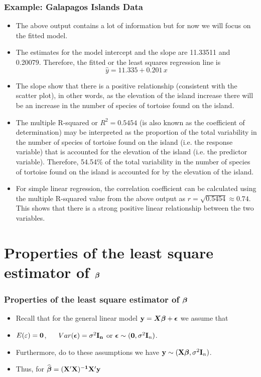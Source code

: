 \documentclass{beamer}
\begin{document}
\begin{frame}[fragile]\frametitle{Example: Galapagos Islands Data}
\begin{itemize}
\item The above output contains a lot of information but for now we will focus on the fitted model.
\item The estimates for the model intercept and the slope are 11.33511 and 0.20079. Therefore, the fitted or the least squares regression line is
    $$
    \hat{y} = 11.335 + 0.201\,x
    $$
\item The slope show that there is a positive relationship (consistent with the scatter plot), in other words, as the elevation of the island increase there will be an increase in the number of species of tortoise found on the island.
\item The multiple R-squared or $R^2 = 0.5454$ (is also known as the coefficient of determination) may be interpreted as the proportion of the total variability in the number of species of tortoise found on the island (i.e. the response variable) that is accounted for the elevation of the island (i.e. the predictor variable). Therefore, 54.54\% of the total variability in the number of species of tortoise found on the island is accounted for by the elevation of the island.
\item For simple linear regression, the correlation coefficient can be calculated using the multiple R-squared value from the above output as $r = \sqrt{0.5454} \approx 0.74$. This shows that there is a strong positive linear relationship between the two variables.
\end{itemize}
\end{frame}


\section{Properties of the least square estimator of  $\mbox{\boldmath $\beta$}$}
\begin{frame}\frametitle{Properties of the least square estimator of  $\mbox{\boldmath $\beta$}$}
\begin{itemize}
\item Recall that for the general linear model ${\bf y}= \mbox{\boldmath $X$}\mbox{\boldmath $\beta$} + \mbox{\boldmath $\epsilon$}$ we assume that
\item $E (\bf \varepsilon) = {\bf 0}$, ~~ $Var(\mbox{\boldmath $\epsilon$}) = \sigma^2{\bf I_n}$ or $\mbox{\boldmath $\epsilon$} \sim \mathcal({\bf 0}, \sigma^2{\bf I}_n)$.
\item Furthermore, do to these assumptions we have ${\bf y} \sim \mathcal({\bf X} \mbox{\boldmath $\beta$}, \sigma^2{\bf I}_n)$.
\item Thus, for $\widehat{\mbox{\boldmath $\beta$}} ={ \bf (X'X)^{-1} X'y}$
\end{itemize}
\end{frame}
\end{document}
